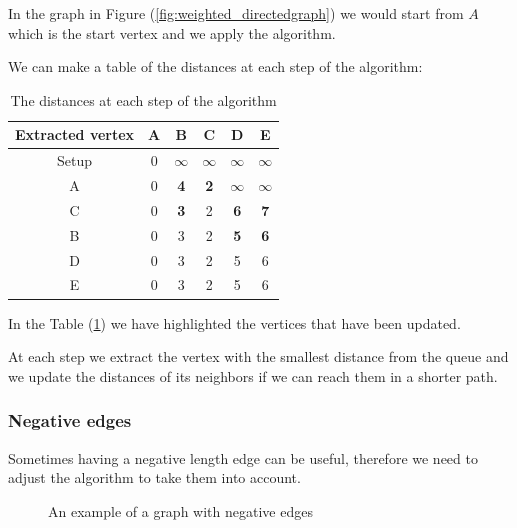 \documentclass[12pt]{extarticle}
\begin{document}
In the graph in Figure (\ref{fig:weighted_directedgraph}) we would start from $A$ which is the start vertex and we apply the algorithm.

We can make a table of the distances at each step of the algorithm:

\begin{table}[H]
    \center
    \begin{tabular}{ |c|c|c|c|c|c| }
        \hline
        Extracted vertex & A & B          & C          & D          & E          \\
        \hline
        Setup            & 0 & $\infty$   & $\infty$   & $\infty$   & $\infty$   \\
        A                & 0 & \textbf{4} & \textbf{2} & $\infty$   & $\infty$   \\
        C                & 0 & \textbf{3} & 2          & \textbf{6} & \textbf{7} \\
        B                & 0 & 3          & 2          & \textbf{5} & \textbf{6} \\
        D                & 0 & 3          & 2          & 5          & 6          \\
        E                & 0 & 3          & 2          & 5          & 6          \\
        \hline
    \end{tabular}
    \caption{The distances at each step of the algorithm}
    \label{tab:dijsktra_distances}
\end{table}

In the Table (\ref{tab:dijsktra_distances}) we have highlighted the vertices that have been updated.

At each step we extract the vertex with the smallest distance from the queue and we update the distances of its neighbors if we can reach them in a shorter path.

\subsubsection{Negative edges}

Sometimes having a negative length edge can be useful, therefore we need to adjust the algorithm to take them into account.

\begin{figure}[H]
    \centering

    \caption{An example of a graph with negative edges}
    \label{fig:negative_edges}
\end{figure}
\end{document}

